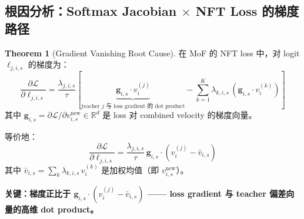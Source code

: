 \documentclass[11pt,a4paper]{article}
\newcommand{\loss}{\mathcal{L}}
\newcommand{\R}{\mathbb{R}}
\theoremstyle{definition}
\newtheorem{theorem}{Theorem}
\begin{document}
\subsection{根因分析：Softmax Jacobian $\times$ NFT Loss 的梯度路径}

\begin{theorem}[Gradient Vanishing Root Cause]
\label{thm:grad_vanish}
在 MoF 的 NFT loss 中，对 logit $\ell_{j,i,s}$ 的梯度为：
\begin{equation}
\boxed{
\frac{\partial \loss}{\partial \ell_{j,i,s}} = \frac{\lambda_{j,i,s}}{\tau} \left[
\underbrace{\mathbf{g}_{i,s} \cdot v^{(j)}_i}_{\text{teacher $j$ 与 loss gradient 的 dot product}} - \sum_{k=1}^K \lambda_{k,i,s}\, \left(\mathbf{g}_{i,s} \cdot v^{(k)}_i\right)
\right]
}
\label{eq:grad_vanish_main}
\end{equation}
其中 $\mathbf{g}_{i,s} = \partial \loss / \partial v^{\mathrm{new}}_{i,s} \in \R^d$ 是 loss 对 combined velocity 的梯度向量。

等价地：
\begin{equation}
\frac{\partial \loss}{\partial \ell_{j,i,s}} = \frac{\lambda_{j,i,s}}{\tau}\, \mathbf{g}_{i,s} \cdot \left(v^{(j)}_i - \bar{v}_{i,s}\right)
\label{eq:grad_dot_product}
\end{equation}
其中 $\bar{v}_{i,s} = \sum_k \lambda_{k,i,s}\, v^{(k)}_i$ 是加权均值（即 $v^{\mathrm{new}}_{i,s}$）。

\textbf{关键：梯度正比于 $\mathbf{g}_{i,s} \cdot (v^{(j)}_i - \bar{v}_{i,s})$ —— loss gradient 与 teacher 偏差向量的高维 dot product。}
\end{theorem}
\end{document}
